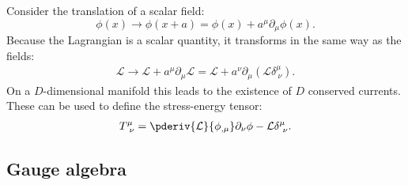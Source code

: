     \begin{definition}
        Consider the translation of a scalar field: \[\phi(x)\longrightarrow\phi(x+a) = \phi(x) + a^\mu\partial_\mu\phi(x).\] Because the Lagrangian is a scalar quantity, it transforms in the same way as the fields:
        \begin{gather}
            \mathcal{L}\longrightarrow\mathcal{L} + a^\mu\partial_\mu\mathcal{L} = \mathcal{L} + a^\nu\partial_\mu(\mathcal{L}\delta^\mu_{\ \nu}).
        \end{gather}
        On a $D$-dimensional manifold this leads to the existence of $D$ conserved currents. These can be used to define the stress-energy tensor:
        \begin{gather}
            \label{field:stress_energy_tensor}
            T^\mu_{\ \nu} = \pderiv{\mathcal{L}}{\phi_{,\mu}}\partial_\nu\phi - \mathcal{L}\delta^\mu_{\ \nu}.
        \end{gather}
    \end{definition}

\subsection{Gauge algebra}

